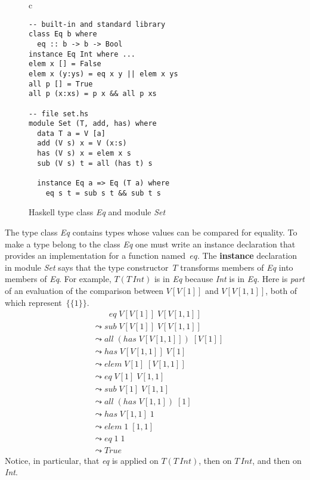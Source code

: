 \documentclass[conference,compsoc]{IEEEtran} %
\begin{document}
\begin{figure}\footnotesize %
\begin{center}
\begin{tabular}{c}
\begin{lstlisting}[style=hs]
-- built-in and standard library
class Eq b where
  eq :: b -> b -> Bool
instance Eq Int where ...
elem x [] = False
elem x (y:ys) = eq x y || elem x ys
all p [] = True
all p (x:xs) = p x && all p xs

-- file set.hs
module Set (T, add, has) where
  data T a = V [a]
  add (V s) x = V (x:s)
  has (V s) x = elem x s
  sub (V s) t = all (has t) s

  instance Eq a => Eq (T a) where
    eq s t = sub s t && sub t s
\end{lstlisting}
\end{tabular}
\end{center}
\caption{Haskell type class \textit{Eq} and module \textit{Set}}
\label{fig:haskell}
\end{figure} %


The type class \textit{Eq} contains types whose values can be compared for
equality. To make a type belong to the class \textit{Eq} one must write an
instance declaration that provides an implementation for a function
named~$eq$. The \textbf{instance} declaration in module \textit{Set} says
that the type constructor~$T$ transforms members of \textit{Eq} into
members of \textit{Eq}. For example, $T(T\,\mathit{Int})$ is in \textit{Eq}
because \textit{Int} is in \textit{Eq.} Here is \emph{part} of an
evaluation of the comparison between $V[V[1]]$ and $V[V[1,1]]$, both of
which represent~$\{\{1\}\}$.
\begin{align*}
&\phantom{\;\leadsto\;}
  \mathit{eq}\;V[V[1]]\;V[V[1,1]] \\
&\leadsto
  \mathit{sub}\;V[V[1]]\;V[V[1,1]]\\
&\leadsto
  \mathit{all}\;(\mathit{has}\;V[V[1,1]])\;[V[1]]\\
&\leadsto
  \mathit{has}\;V[V[1,1]]\;V[1]\\
&\leadsto
  \mathit{elem}\;V[1]\;[V[1,1]]\\
&\leadsto
  \mathit{eq}\;V[1]\;V[1,1]\\
&\leadsto
  \mathit{sub}\;V[1]\;V[1,1]\\
&\leadsto
  \mathit{all}\;(\mathit{has}\;V[1,1])\;[1]\\
&\leadsto
  \mathit{has}\;V[1,1]\;1 \\
&\leadsto
  \mathit{elem}\;1\;[1,1]\\
&\leadsto
  \mathit{eq}\;1\;1\\
&\leadsto
  \mathit{True}
\end{align*}
Notice, in particular, that \textit{eq} is applied on $T(T\,\mathit{Int})$,
then on $T\,\mathit{Int}$, and then on \textit{Int}.
\end{document}
